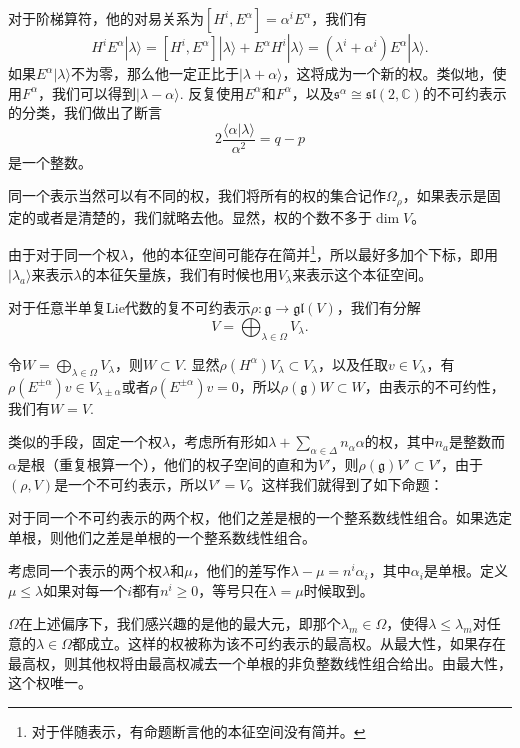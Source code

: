 \documentclass[11pt]{article}
\theoremstyle{definition}
\theoremstyle{plain}
\newcommand{\cc}{\mathbb{C}}
\newcommand{\lag}{{\mathfrak{g}}}
\begin{document}
对于阶梯算符，他的对易关系为$[H^i,E^\alpha]=\alpha^iE^\alpha$，我们有
\[
	H^iE^\alpha|\lambda\rangle=[H^i,E^\alpha]|\lambda\rangle+E^\alpha H^i|\lambda\rangle=(\lambda^i+\alpha^i)E^\alpha |\lambda\rangle.
\]
如果$E^\alpha |\lambda\rangle$不为零，那么他一定正比于$|\lambda+\alpha\rangle$，这将成为一个新的权。类似地，使用$F^\alpha$，我们可以得到$|\lambda-\alpha\rangle$. 反复使用$E^\alpha$和$F^\alpha$，以及$\mathfrak{s}^\alpha\cong \mathfrak{sl}(2,\cc)$的不可约表示的分类，我们做出了断言
\[
	2\frac{\langle\alpha|\lambda\rangle}{\alpha^2}=q-p
\]
是一个整数。

同一个表示当然可以有不同的权，我们将所有的权的集合记作$\Omega_\rho$，如果表示是固定的或者是清楚的，我们就略去他。显然，权的个数不多于$\dim V$。

\para 由于对于同一个权$\lambda$，他的本征空间可能存在简并\footnote{对于伴随表示，有命题断言他的本征空间没有简并。}，所以最好多加个下标，即用$|\lambda_a\rangle$来表示$\lambda$的本征矢量族，我们有时候也用$V_{\lambda}$来表示这个本征空间。

{\pro 对于任意半单复Lie代数的复不可约表示$\rho:\lag\to \mathfrak{gl}(V)$，我们有分解
\[
	V=\bigoplus_{\lambda\in\Omega} V_\lambda.
\]
\endpro}

\proof 令$W=\bigoplus_{\lambda\in\Omega} V_\lambda$，则$W\subset V$. 显然$\rho(H^\alpha)V_\lambda\subset V_\lambda$，以及任取$v\in V_\lambda$，有$\rho(E^{\pm\alpha})v \in V_{\lambda\pm\alpha}$或者$\rho(E^{\pm\alpha})v=0$，所以$\rho(\lag)W\subset W$，由表示的不可约性，我们有$W=V$. \endproof

类似的手段，固定一个权$\lambda$，考虑所有形如$\lambda+\sum_{\alpha\in\Delta} n_\alpha\alpha$的权，其中$n_a$是整数而$\alpha$是根（重复根算一个），他们的权子空间的直和为$V'$，则$\rho(\lag)V'\subset V'$，由于$(\rho,V)$是一个不可约表示，所以$V'=V$。这样我们就得到了如下命题：

{\pro 对于同一个不可约表示的两个权，他们之差是根的一个整系数线性组合。如果选定单根，则他们之差是单根的一个整系数线性组合。\endpro}

\para 考虑同一个表示的两个权$\lambda$和$\mu$，他们的差写作$\lambda-\mu=n^i \alpha_i$，其中$\alpha_i$是单根。定义$\mu \leq \lambda$如果对每一个$i$都有$n^i\geq 0$，等号只在$\lambda=\mu$时候取到。

$\Omega$在上述偏序下，我们感兴趣的是他的最大元，即那个$\lambda_m\in \Omega$，使得$\lambda\leq \lambda_m$对任意的$\lambda\in \Omega$都成立。这样的权被称为该不可约表示的最高权。从最大性，如果存在最高权，则其他权将由最高权减去一个单根的非负整数线性组合给出。由最大性，这个权唯一。
\end{document}
